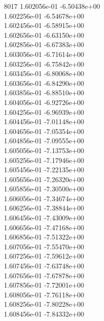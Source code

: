 8017	1.602056e-01	-6.50438e+00	\\ 	1.602256e-01	-6.54678e+00	\\ 	1.602456e-01	-6.58915e+00	\\ 	1.602656e-01	-6.63150e+00	\\ 	1.602856e-01	-6.67383e+00	\\ 	1.603056e-01	-6.71614e+00	\\ 	1.603256e-01	-6.75842e+00	\\ 	1.603456e-01	-6.80068e+00	\\ 	1.603656e-01	-6.84290e+00	\\ 	1.603856e-01	-6.88510e+00	\\ 	1.604056e-01	-6.92726e+00	\\ 	1.604256e-01	-6.96939e+00	\\ 	1.604456e-01	-7.01148e+00	\\ 	1.604656e-01	-7.05354e+00	\\ 	1.604856e-01	-7.09555e+00	\\ 	1.605056e-01	-7.13753e+00	\\ 	1.605256e-01	-7.17946e+00	\\ 	1.605456e-01	-7.22135e+00	\\ 	1.605656e-01	-7.26320e+00	\\ 	1.605856e-01	-7.30500e+00	\\ 	1.606056e-01	-7.34674e+00	\\ 	1.606256e-01	-7.38844e+00	\\ 	1.606456e-01	-7.43009e+00	\\ 	1.606656e-01	-7.47168e+00	\\ 	1.606856e-01	-7.51322e+00	\\ 	1.607056e-01	-7.55470e+00	\\ 	1.607256e-01	-7.59612e+00	\\ 	1.607456e-01	-7.63748e+00	\\ 	1.607656e-01	-7.67878e+00	\\ 	1.607856e-01	-7.72001e+00	\\ 	1.608056e-01	-7.76118e+00	\\ 	1.608256e-01	-7.80228e+00	\\ 	1.608456e-01	-7.84332e+00	\\ \hline

